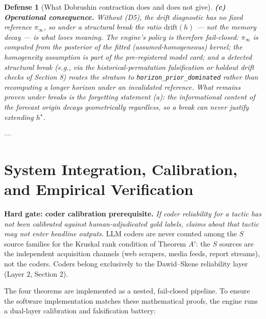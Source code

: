 \documentclass[11pt,a4paper]{article}
\newtheorem{defense}{Defense}
\begin{document}
\begin{defense}[What Dobrushin contraction does and does not give]
\textbf{(c) Operational consequence.} Without (D5), the drift diagnostic has no fixed reference $\pi_\infty$, so under a structural break the \emph{ratio} $\text{drift}(h)$ --- not the memory decay --- is what loses meaning. The engine's policy is therefore fail-closed: $\pi_\infty$ is computed from the posterior of the fitted (assumed-homogeneous) kernel; the homogeneity assumption is part of the pre-registered model card; and a detected structural break (e.g., via the historical-permutation falsification or holdout drift checks of Section 8) routes the stratum to \texttt{horizon\_prior\_dominated} rather than recomputing a longer horizon under an invalidated reference. What remains \emph{proven} under breaks is the forgetting statement (a): the informational content of the forecast origin decays geometrically regardless, so a break can never justify extending $h^\star$. %
\end{defense}

---

\section{System Integration, Calibration, and Empirical Verification}

\noindent\textbf{Hard gate: coder calibration prerequisite.} \emph{If coder reliability for a tactic has not been calibrated against human-adjudicated gold labels, claims about that tactic may not enter headline outputs.} LLM coders are never counted among the $S$ source families for the Kruskal rank condition of Theorem $A'$: the $S$ sources are the independent acquisition channels (web scrapers, media feeds, report streams), not the coders. Coders belong exclusively to the Dawid--Skene reliability layer (Layer 2, Section 2). %

The four theorems are implemented as a nested, fail-closed pipeline. To ensure the software implementation matches these mathematical proofs, the engine runs a dual-layer calibration and falsification battery:
\end{document}

